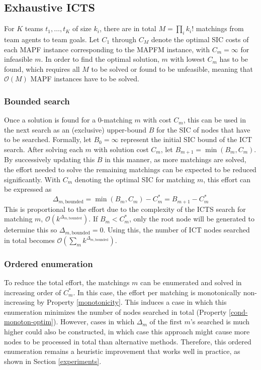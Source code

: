 \documentclass[english]{article}
\begin{document}
	\subsection{Exhaustive ICTS}
	\label{exhaustive}
	For $K$ teams $t_1,\ldots,t_K$ of size $k_i$, there are in total $M = \prod_{i} k_i!$ matchings from team agents to team goals. Let $C_1$ through $C_M$ denote the optimal SIC costs of each MAPF instance corresponding to the MAPFM instance, with $C_m = \infty$ for infeasible $m$. In order to find the optimal solution, $m$ with lowest $C_m$ has to be found, which requires all $M$ to be solved or found to be unfeasible, meaning that $\mathcal{O}(M)$ MAPF instances have to be solved. 
	\subsubsection{Bounded search}
	Once a solution is found for a 0-matching $m$ with cost $C_m$, this can be used in the next search as an (exclusive) upper-bound $B$ for the SIC of nodes that have to be searched. Formally, let $B_0 = \infty$ represent the initial SIC bound of the ICT search. After solving each $m$ with solution cost $C_m$, let $B_{m+1} = \min(B_m,C_m)$. By successively updating this $B$ in this manner, as more matchings are solved, the effort needed to solve the remaining matchings can be expected to be reduced significantly. With $C_m$ denoting the optimal SIC for matching $m$, this effort can be expressed as	
	\[\Delta_{m,\text{bounded}} = \min(B_m,C_m) - C^*_m = B_{m+1} - C^*_m\]
	This is proportional to the effort due to the complexity of the ICTS search for matching $m$, $\mathcal{O}(k^{\Delta_{m,\text{bounded}}})$.
	If $B_m < C^*_m$, only the root node will be generated to determine this so $\Delta_{m,\text{bounded}} = 0$.
	Using this, the number of ICT nodes searched in total becomes $\mathcal{O}(\sum_m k^{\Delta_{m,\text{bounded}}})$.
	\subsubsection{Ordered enumeration}
	\label{ordered-enum}
	To reduce the total effort, the matchings $m$ can be enumerated and solved in increasing order of $C^*_m$. In this case, the effort per matching is monotonically non-increasing by Property \ref{monotonicity}. This induces a case in which this enumeration minimizes the number of nodes searched in total (Property \ref{cond-monoton-optim}). However, cases in which $\Delta_m$ of the first $m$'s searched is much higher could also be constructed, in which case this approach might cause more nodes to be processed in total than alternative methods. Therefore, this ordered enumeration remains a heuristic improvement that works well in practice, as shown in Section \ref{experiments}.
	
\end{document}

